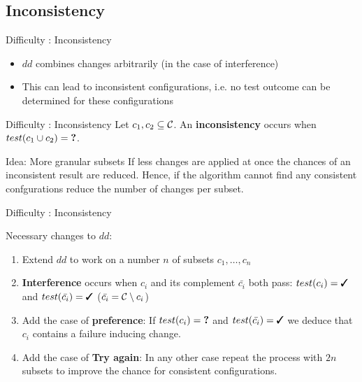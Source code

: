 \subsection{Inconsistency}
\begin{frame}{Difficulty : Inconsistency}
	\begin{itemize}
		\item $dd$ combines changes arbitrarily (in the case of interference)
		\item This can lead to inconsistent configurations, i.e. no test outcome can be determined for these configurations 
	\end{itemize}

	\begin{alertblock}{Difficulty : Inconsistency}
		Let $c_1,c_2 \subseteq \mathcal{C}$. An \textbf{inconsistency} occurs when $test(c_1 \cup c_2) = \textbf{?}$.
	\end{alertblock}
	\bigskip
	\begin{exampleblock}{Idea: More granular subsets}
		If less changes are applied at once the chances of an inconsistent result are reduced. Hence, if the algorithm cannot find any consistent confgurations reduce the number of changes per subset.
	\end{exampleblock}

\end{frame}

\begin{frame}{Difficulty : Inconsistency}
	
	Necessary changes to $dd$:
	\begin{enumerate}
		\item Extend $dd$ to work on a number $n$ of subsets $c_1, \dots, c_n$
		\item \textbf{Interference} occurs when $c_i$ and its complement $\bar{c_i}$ both pass: $test(c_i) = \cmark$ and $test(\bar{c_i}) = \cmark$ ($\bar{c_i}=\mathcal{C} \setminus c_i$)
		\item Add the case of \textbf{preference}: If $test(c_i)=\textbf{?}$ and $test(\bar{c_i})=\cmark$ we deduce that $c_i$ contains a failure inducing change. 
		\item Add the case of \textbf{Try again}: In any other case repeat the process with $2n$ subsets to improve the chance for consistent configurations.
	\end{enumerate}
\end{frame}